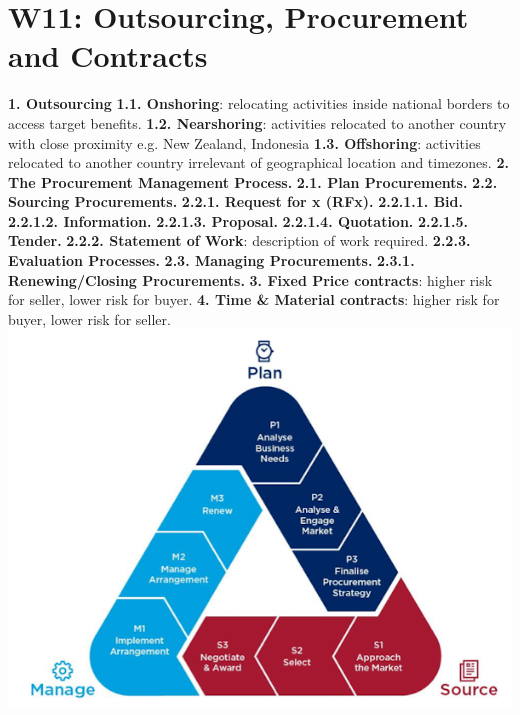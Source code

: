 \section{W11: Outsourcing, Procurement and Contracts}

\textbf{1. Outsourcing}
\textbf{1.1. Onshoring}: relocating activities inside national borders to access target benefits.
\textbf{1.2. Nearshoring}: activities relocated to another country with close proximity e.g. New Zealand, Indonesia
\textbf{1.3. Offshoring}: activities relocated to another country irrelevant of geographical location and timezones.
\textbf{2. The Procurement Management Process.}
    \textbf{2.1. Plan Procurements.}
    \textbf{2.2. Sourcing Procurements.}
        \textbf{2.2.1. Request for x (RFx).}
            \textbf{2.2.1.1. Bid.}
            \textbf{2.2.1.2. Information.}
            \textbf{2.2.1.3. Proposal.}
            \textbf{2.2.1.4. Quotation.}
            \textbf{2.2.1.5. Tender.}
        \textbf{2.2.2. Statement of Work}: description of work required.
        \textbf{2.2.3. Evaluation Processes.}
    \textbf{2.3. Managing Procurements.}
        \textbf{2.3.1. Renewing/Closing Procurements.}
\textbf{3. Fixed Price contracts}: higher risk for seller, lower risk for buyer.
\textbf{4. Time \& Material contracts}: higher risk for buyer, lower risk for seller.
\includegraphics[width=\linewidth]{figs/SCR-20240606-tfgb.png}

